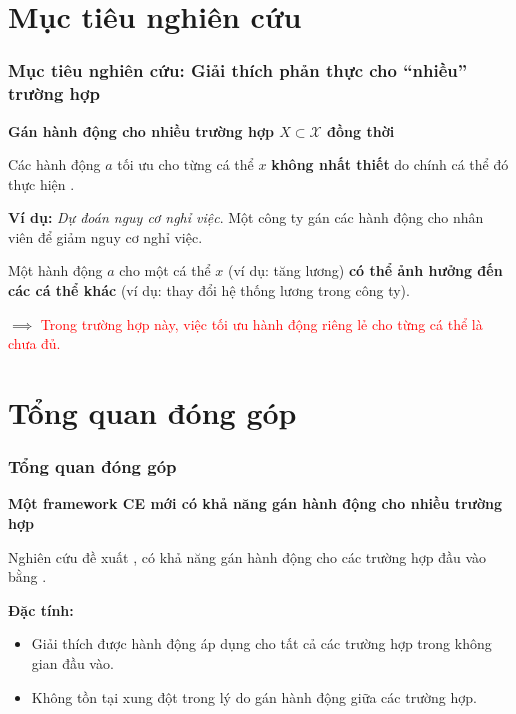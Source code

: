 \documentclass[notheorems, aspectratio=149]{beamer}
\begin{document}
\section{Mục tiêu nghiên cứu}
\begin{frame}
    \frametitle{Mục tiêu nghiên cứu: Giải thích phản thực cho ``nhiều'' trường hợp}

    \begin{tcolorbox}[custombox]
        \bfseries Gán hành động cho nhiều trường hợp $X \subset \mathcal{X}$ đồng thời
    \end{tcolorbox}

    Các hành động $a$ tối ưu cho từng cá thể $x$ \textbf{không nhất thiết} do chính cá thể đó thực hiện \parencite{karimi2021surveyalgorithmicrecoursedefinitions}.
        
    \textbf{Ví dụ:} \textit{Dự đoán nguy cơ nghỉ việc}.
    Một công ty gán các hành động cho nhân viên để giảm nguy cơ nghỉ việc.

    Một hành động $a$ cho một cá thể $x$ (ví dụ: tăng lương) \textbf{có thể ảnh hưởng đến các cá thể khác} 
    (ví dụ: thay đổi hệ thống lương trong công ty).
        
    $\implies$ \textcolor{red}{Trong trường hợp này, việc tối ưu hành động riêng lẻ cho từng cá thể là chưa đủ.}
        
\end{frame}

\section{Tổng quan đóng góp}

\begin{frame}
    \frametitle{Tổng quan đóng góp}

    \begin{tcolorbox}[custombox]
        \bfseries Một framework CE mới có khả năng gán hành động cho nhiều trường hợp
    \end{tcolorbox}

    \vspace{0.3cm}
    Nghiên cứu đề xuất , 
    có khả năng gán hành động cho các trường hợp đầu vào bằng .

    \vspace{0.3cm}
    \textbf{Đặc tính:}
    \begin{itemize}
        \item {} Giải thích được hành động áp dụng cho tất cả các trường hợp trong không gian đầu vào.
        \item {} Không tồn tại xung đột trong lý do gán hành động giữa các trường hợp.
    \end{itemize}
\end{frame}
\end{document}
